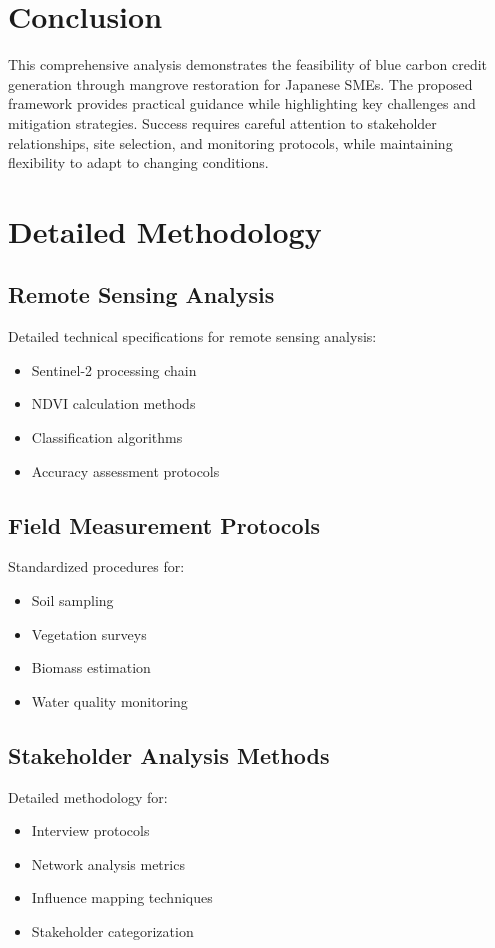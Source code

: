 \documentclass{article}
\theoremstyle{plain}
\theoremstyle{definition}
\theoremstyle{remark}
\begin{document}
\section{Conclusion}
This comprehensive analysis demonstrates the feasibility of blue carbon credit generation through mangrove restoration for Japanese SMEs. The proposed framework provides practical guidance while highlighting key challenges and mitigation strategies. Success requires careful attention to stakeholder relationships, site selection, and monitoring protocols, while maintaining flexibility to adapt to changing conditions.




\appendix
\section{Detailed Methodology}

\subsection{Remote Sensing Analysis}
Detailed technical specifications for remote sensing analysis:
\begin{itemize}
\item Sentinel-2 processing chain
\item NDVI calculation methods
\item Classification algorithms
\item Accuracy assessment protocols
\end{itemize}

\subsection{Field Measurement Protocols}
Standardized procedures for:
\begin{itemize}
\item Soil sampling
\item Vegetation surveys
\item Biomass estimation
\item Water quality monitoring
\end{itemize}

\subsection{Stakeholder Analysis Methods}
Detailed methodology for:
\begin{itemize}
\item Interview protocols
\item Network analysis metrics
\item Influence mapping techniques
\item Stakeholder categorization
\end{itemize}
\end{document}

